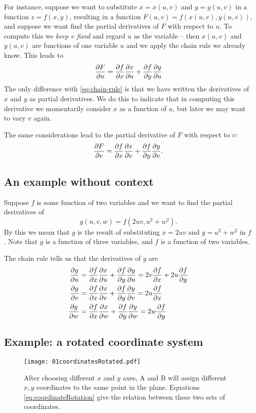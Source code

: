 For instance, suppose we want to substitute $x=x(u,v)$ and $y=y(u,v)$ in a
function $z=f(x, y)$, resulting in a function $F(u,v) = f(x(u,v), y(u,v))$, and
suppose we want find the partial derivatives of $F$ with respect to $u$.  To
compute this we \textit{keep $v$ fixed} and regard $u$ as the variable -- then
$x(u, v)$ and $y(u, v)$ are functions of one variable $u$ and we apply the chain
rule we already know.  This leads to
\[
\frac{\partial F}{\partial u} = \frac{\partial f}{\partial x} \frac{\partial x}{\partial u} + \frac{\partial f}{\partial y} \frac{\partial y}{\partial u}
\]
The only difference with \eqref{eq:chain-rule} is that we have written the
derivatives of $x$ and $y$ as partial derivatives.  We do this to indicate that
in computing this derivative we momentarily consider $x$ as a function of $u$,
but later we may want to vary $v$ again.

The same considerations lead to the partial derivative of $F$ with respect to
$v$:
\[
\frac{\partial F}{\partial v} = \frac{\partial f}{\partial x} \frac{\partial x}{\partial v} + \frac{\partial f}{\partial y} \frac{\partial y}{\partial v}.
\]
\subsection{An example without context}
Suppose $f$ is some function of two variables and we want to find the partial
derivatives of
\[
g(u, v, w) = f(2uv, u^2+w^2).
\]
By this we mean that $g$ is the result of substituting $x= 2uv$ and $y=u^2+w^2$
in $f$.  Note that $g$ is a function of three variables, and $f$ is a function
of two variables.

The chain rule tells us that the derivatives of $g$ are
\begin{align*}
  \frac{\partial g}{\partial u} &= \frac{\partial f}{\partial x}\frac{\partial x}{\partial u} +\frac{\partial f}{\partial y} \frac{\partial y}{\partial u} = 2v\frac{\partial f}{\partial x} + 2u\frac{\partial f}{\partial y}\\
  \frac{\partial g}{\partial v} &= \frac{\partial f}{\partial x}\frac{\partial x}{\partial v} +\frac{\partial f}{\partial y} \frac{\partial y}{\partial v} = 2u\frac{\partial f}{\partial x} \\
  \frac{\partial g}{\partial w} &= \frac{\partial f}{\partial x}\frac{\partial x}{\partial w} +\frac{\partial f}{\partial y} \frac{\partial y}{\partial w} = 2w\frac{\partial f}{\partial y}
\end{align*}


\subsection{Example: a rotated coordinate system}
\label{sec:01rotated-coordinates}

\begin{figure}[b]
  \centering
  \texttt{[image: 01coordinatesRotated.pdf]}
  \caption{After choosing different $x$ and $y$ axes, A and B will assign
    different $x, y$ coordinates to the same point in the plane.  Equations
    \eqref{eq:coordinateRotation} give the relation between these two sets of
    coordinates. }
  \label{fig:coordinateRotation}
\end{figure}

